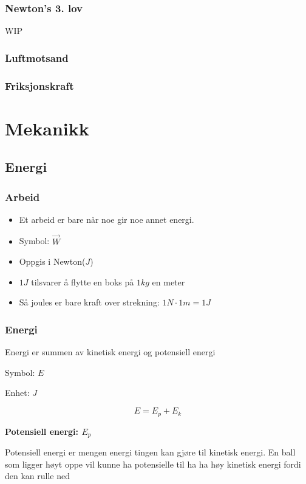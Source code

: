\documentclass{article}
\begin{document}
\subsubsection{Newton's 3. lov}

WIP

\subsubsection{Luftmotsand}

\subsubsection{Friksjonskraft}

\section{Mekanikk}

\subsection{Energi}

\subsubsection{Arbeid}

\begin{itemize}
    \item Et arbeid er bare når noe gir noe annet energi.
    \item Symbol: $\vec{W}$
    \item Oppgis i Newton($J$)
    \item $1J$ tilsvarer å flytte en boks på $1kg$ en meter
    \item Så joules er bare kraft over strekning: $1N \cdot 1m = 1J$
\end{itemize}

\subsubsection{Energi}

Energi er summen av kinetisk energi og potensiell energi

Symbol: $E$

Enhet: $J$

$$E=E_p + E_k$$

\textbf{Potensiell energi: $E_p$}

Potensiell energi er mengen energi tingen kan gjøre til kinetisk energi.
En ball som ligger høyt oppe vil kunne ha potensielle til ha ha høy kinetisk energi fordi den kan rulle ned
\end{document}
